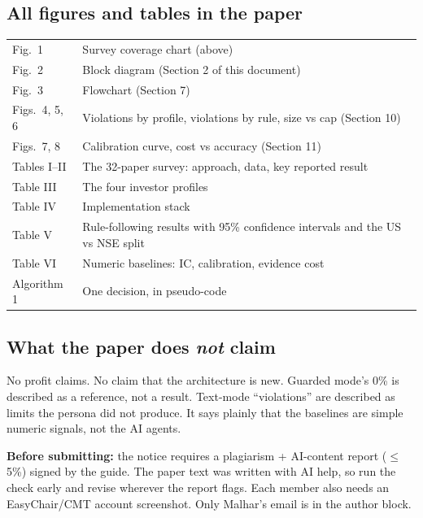 \documentclass[10.5pt,a4paper]{article}
\begin{document}
\subsection{All figures and tables in the paper}

\begin{tabularx}{\linewidth}{L{2.8cm}Y}
\toprule
Fig.\ 1 & Survey coverage chart (above) \\
Fig.\ 2 & Block diagram (Section 2 of this document) \\
Fig.\ 3 & Flowchart (Section 7) \\
Figs.\ 4, 5, 6 & Violations by profile, violations by rule, size vs cap (Section 10) \\
Figs.\ 7, 8 & Calibration curve, cost vs accuracy (Section 11) \\
Tables I--II & The 32-paper survey: approach, data, key reported result \\
Table III & The four investor profiles \\
Table IV & Implementation stack \\
Table V & Rule-following results with 95\% confidence intervals and the US vs NSE split \\
Table VI & Numeric baselines: IC, calibration, evidence cost \\
Algorithm 1 & One decision, in pseudo-code \\
\bottomrule
\end{tabularx}

\subsection{What the paper does \emph{not} claim}
No profit claims. No claim that the architecture is new. Guarded mode's 0\% is described as a reference, not a result. Text-mode ``violations'' are described as limits the persona did not produce. It says plainly that the baselines are simple numeric signals, not the AI agents.

\begin{warnbox}
\textbf{Before submitting:} the notice requires a plagiarism + AI-content report ($\le$5\%) signed by the guide. The paper text was written with AI help, so run the check early and revise wherever the report flags. Each member also needs an EasyChair/CMT account screenshot. Only Malhar's email is in the author block.
\end{warnbox}

\end{document}

